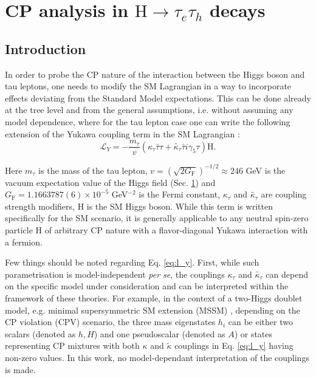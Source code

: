 \chapter{CP analysis in $\text{H} \to \tau_e\tau_h$ decays}
\section{Introduction}\label{sec:cp-intro}

In order to probe the CP nature of the interaction between the Higgs boson and tau leptons, one needs to modify the SM Lagrangian in a way to incorporate effects deviating from the Standard Model expectations. This can be done already at the tree level and from the general assumptions, i.e. without assuming any model dependence, where for the tau lepton case one can write the following extension of the Yukawa coupling term in the SM Lagrangian \cite{Gritsan:2016hjl}:
\begin{equation}\label{eq:l_y}
    \mathcal{L}_Y = -\frac{m_\tau}{v}(\kappa_\tau\bar{\tau}\tau + \tilde{\kappa_\tau}\bar{\tau}i\gamma_5\tau) \text{H}.
\end{equation}

Here $m_\tau$ is the mass of the tau lepton, $v=\left(\sqrt{2G_\text{F}}\right)^{-1/2} \approx 246$ GeV is the vacuum expectation value of the Higgs field (Sec. \ref{}) and $G_\text{F} = 1.1663787(6) × 10^{−5}$ GeV$^{-2}$ is the Fermi constant, $\kappa_\tau$ and $\tilde{\kappa_\tau}$ are coupling strength
modifiers, H is the SM Higgs boson. While this term is written specifically for the SM scenario, it is generally applicable to any neutral spin-zero particle H of arbitrary CP nature with a flavor-diagonal Yukawa interaction with a fermion. 

Few things should be noted regarding Eq. \ref{eq:l_y}. First, while such parametrisation is model-independent \textit{per se}, the couplings $\kappa_\tau$ and $\tilde{\kappa_\tau}$ can depend on the specific model under consideration and can be interpreted within the framework of these theories. For example, in the context of a two-Higgs doublet model, e.g. minimal supersymmetric SM
extension (MSSM) \cite{Accomando:2006ga}, depending on the CP violation (CPV) scenario, the three mass eigenstates $h_i$ can be either two scalars (denoted as $h, H$) and one pseudoscalar (denoted as $A$) or states representing CP mixtures with both $\kappa$ and $\tilde{\kappa}$ couplings in Eq. \ref{eq:l_y} having non-zero values.  In this work, no model-dependant interpretation of the couplings is made.    

